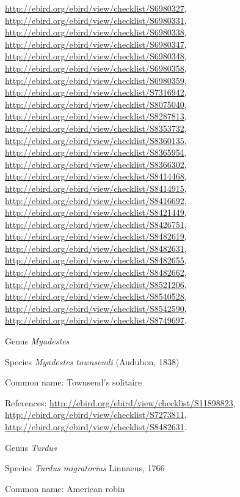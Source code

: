\documentclass[9pt, article]{memoir}
\begin{document}
\begin{multicols}{2}
\url{http://ebird.org/ebird/view/checklist/S6980327}, 
\url{http://ebird.org/ebird/view/checklist/S6980331}, 
\url{http://ebird.org/ebird/view/checklist/S6980338}, 
\url{http://ebird.org/ebird/view/checklist/S6980347}, 
\url{http://ebird.org/ebird/view/checklist/S6980348}, 
\url{http://ebird.org/ebird/view/checklist/S6980358}, 
\url{http://ebird.org/ebird/view/checklist/S6980359}, 
\url{http://ebird.org/ebird/view/checklist/S7316942}, 
\url{http://ebird.org/ebird/view/checklist/S8075040}, 
\url{http://ebird.org/ebird/view/checklist/S8287813}, 
\url{http://ebird.org/ebird/view/checklist/S8353732}, 
\url{http://ebird.org/ebird/view/checklist/S8360135}, 
\url{http://ebird.org/ebird/view/checklist/S8365954}, 
\url{http://ebird.org/ebird/view/checklist/S8366302}, 
\url{http://ebird.org/ebird/view/checklist/S8414468}, 
\url{http://ebird.org/ebird/view/checklist/S8414915}, 
\url{http://ebird.org/ebird/view/checklist/S8416692}, 
\url{http://ebird.org/ebird/view/checklist/S8421449}, 
\url{http://ebird.org/ebird/view/checklist/S8426751}, 
\url{http://ebird.org/ebird/view/checklist/S8482619}, 
\url{http://ebird.org/ebird/view/checklist/S8482631}, 
\url{http://ebird.org/ebird/view/checklist/S8482655}, 
\url{http://ebird.org/ebird/view/checklist/S8482662}, 
\url{http://ebird.org/ebird/view/checklist/S8521206}, 
\url{http://ebird.org/ebird/view/checklist/S8540528}, 
\url{http://ebird.org/ebird/view/checklist/S8542590}, 
\url{http://ebird.org/ebird/view/checklist/S8749697}.

\vspace{6pt}\noindent\hspace{30pt}Genus \textit{Myadestes}


\vspace{6pt}\noindent\hspace{36pt}Species \textit{Myadestes townsendi} (Audubon, 1838)


Common name: Townsend's solitaire

References: 
\url{http://ebird.org/ebird/view/checklist/S11898823}, 
\url{http://ebird.org/ebird/view/checklist/S7273811}, 
\url{http://ebird.org/ebird/view/checklist/S8482631}.

\vspace{6pt}\noindent\hspace{30pt}Genus \textit{Turdus}


\vspace{6pt}\noindent\hspace{36pt}Species \textit{Turdus migratorius} Linnaeus, 1766


Common name: American robin


\end{multicols}
\end{document}
